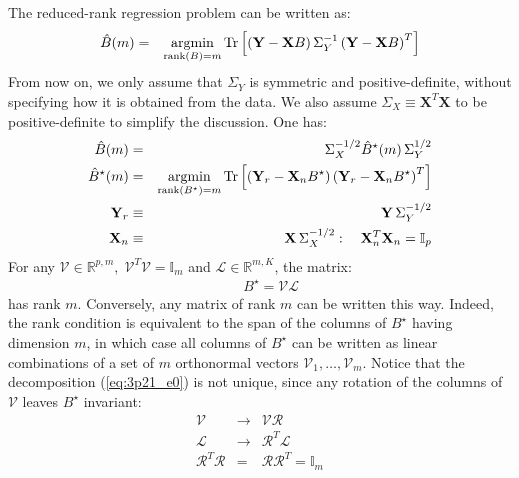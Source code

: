 

The reduced-rank regression problem can be written as:
\begin{eqnarray} \label{eq:3p21_def}
\hat{B}(m) & = & \operatorname*{argmin}_{\textrm{rank}(B) = m} \textrm{Tr} \left[  \left( \mathbf{Y} - \mathbf{X} B \right) \Sigma_Y ^{-1} \left( \mathbf{Y} - \mathbf{X} B \right) ^T \right]
\end{eqnarray}
From now on, we only assume that $\Sigma_Y$ is symmetric and positive-definite, without specifying how it is obtained from the data. We also assume $\Sigma_X \equiv \mathbf{X}^T \mathbf{X}$ to be positive-definite to simplify the discussion. One has:
\begin{eqnarray*}
    \hat{B}(m) & = & \Sigma_X ^{-1/2} \hat{B} ^{\star}(m)\, \Sigma_Y^{1/2} \\
    \hat{B} ^{\star}(m) & = & \operatorname*{argmin}_{\textrm{rank}(B ^{\star}) = m} \textrm{Tr} \left[  \left( \mathbf{Y}_r - \mathbf{X}_n B ^{\star} \right) \left( \mathbf{Y}_r - \mathbf{X}_n B ^{\star} \right) ^T \right]\\
    \mathbf{Y}_r & \equiv & \mathbf{Y}\, \Sigma_Y ^{-1/2}\\
    \mathbf{X}_n & \equiv & \mathbf{X}\, \Sigma_X ^{-1/2}: \quad \mathbf{X}_n^T \mathbf{X}_n = \mathbb{I}_p
\end{eqnarray*}
For any $\mathcal{V} \in \mathbb{R}^{p, m}, \; \mathcal{V}^T \mathcal{V} = \mathbb{I}_m$ and $\mathcal{L} \in \mathbb{R}^{m, K}$, the matrix:
\begin{eqnarray} \label{eq:3p21_e0}
&&B ^{\star}  =  \mathcal{V} \mathcal{L}
\end{eqnarray}
has rank $m$. Conversely, any matrix of rank $m$ can be written this way. Indeed, the rank condition is equivalent to the span of the columns of $B ^{\star}$ having dimension $m$, in which case all columns of $B ^{\star}$ can be written as linear combinations of a set of $m$ orthonormal vectors $\mathcal{V}_1, \ldots, \mathcal{V}_m$. Notice that the decomposition (\ref{eq:3p21_e0}) is not unique, since any rotation of the columns of $\mathcal{V}$ leaves $B ^{\star}$ invariant:
\begin{eqnarray}
\mathcal{V} & \rightarrow & \mathcal{V} \mathcal{R}\\
\mathcal{L} & \rightarrow & \mathcal{R}^T \mathcal{L}\\
\mathcal{R} ^T  \mathcal{R} & = &  \mathcal{R}  \mathcal{R} ^T = \mathbb{I}_m
\end{eqnarray}
